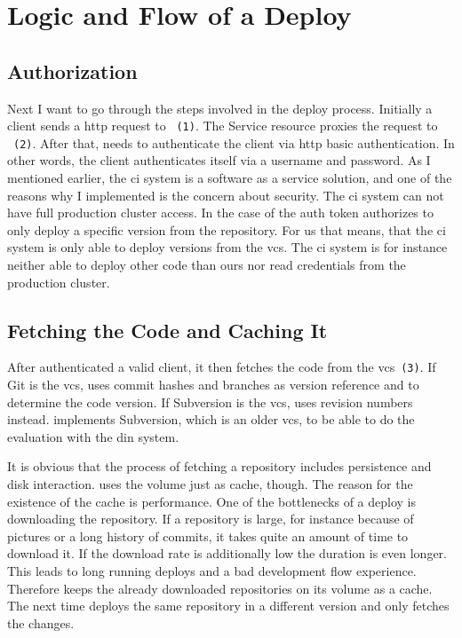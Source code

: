 \section{Logic and Flow of a Deploy}

\subsection{Authorization}

Next I want to go through the steps involved in the deploy process. Initially a client
sends a http request to \deployer~\texttt{(1)}. The Service resource proxies the request
to \deployer~\texttt{(2)}. After that, \deployer needs to authenticate the client via http
basic authentication. In other words, the client authenticates itself via a username and
password. As I mentioned earlier, the \gls{ci} system is a software as a service solution,
and one of the reasons why I implemented \deployer is the concern about security. The
\gls{ci} system can not have full production cluster access. In the case of \deployer the
auth token authorizes to only deploy a specific version from the repository. For us that
means, that the \gls{ci} system is only able to deploy versions from the \gls{vcs}. The
\gls{ci} system is for instance neither able to deploy other code than ours nor read
credentials from the production cluster.

\subsection{Fetching the Code and Caching It}
\label{sec:cache}

After \deployer authenticated a valid client, it then fetches the code from the
\gls{vcs}~\texttt{(3)}. If Git is the \gls{vcs}, \deployer uses commit hashes and branches
as version reference and to determine the code version. If Subversion is the \gls{vcs},
\deployer uses revision numbers instead. \deployer implements Subversion, which is an
older \gls{vcs}, to be able to do the evaluation with the \gls{din} system.

It is obvious that the process of fetching a repository includes persistence and disk
interaction. \deployer uses the volume just as cache, though. The reason for the existence
of the cache is performance. One of the bottlenecks of a deploy is downloading the
repository. If a repository is large, for instance because of pictures or a long history
of commits, it takes quite an amount of time to download it. If the download rate is
additionally low the duration is even longer. This leads to long running deploys and a bad
development flow experience. Therefore \deployer keeps the already downloaded repositories
on its volume as a cache. The next time \deployer deploys the same repository in a
different version and \deployer only fetches the changes.

